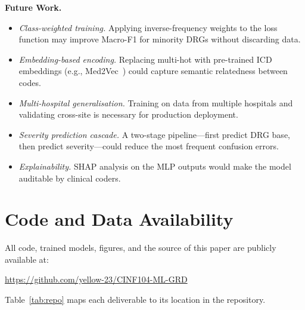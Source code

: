 \documentclass{IEEEtran}
\begin{document}
\textbf{Future Work.}
\begin{itemize}
  \item \textit{Class-weighted training.}
        Applying inverse-frequency weights to the loss function
        may improve Macro-F1 for minority DRGs without discarding
        data.
  \item \textit{Embedding-based encoding.}
        Replacing multi-hot with pre-trained ICD embeddings
        (e.g., Med2Vec~\cite{choi2016m2v}) could capture
        semantic relatedness between codes.
  \item \textit{Multi-hospital generalisation.}
        Training on data from multiple hospitals and validating
        cross-site is necessary for production deployment.
  \item \textit{Severity prediction cascade.}
        A two-stage pipeline—first predict DRG base, then
        predict severity—could reduce the most frequent
        confusion errors.
  \item \textit{Explainability.}
        SHAP analysis on the MLP outputs would make the model
        auditable by clinical coders.
\end{itemize}

\section*{Code and Data Availability}

All code, trained models, figures, and the source of this paper
are publicly available at:

\begin{center}
\url{https://github.com/yellow-23/CINF104-ML-GRD}
\end{center}

Table~\ref{tab:repo} maps each deliverable to its location in
the repository.
\end{document}
